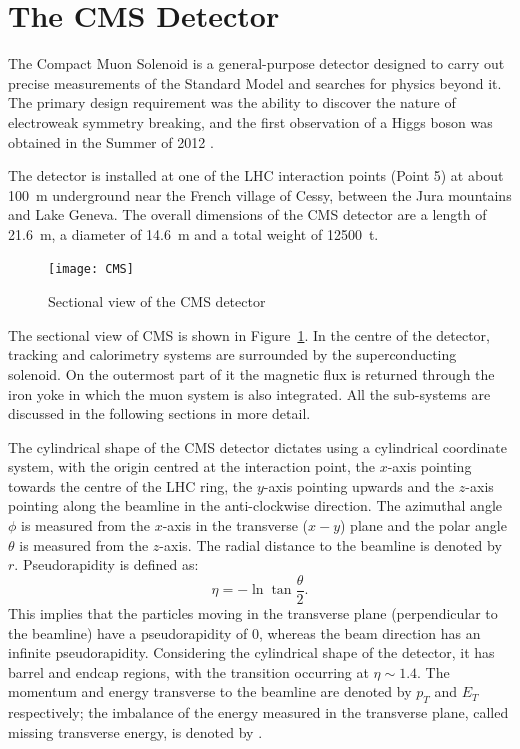 \section{The CMS Detector}
\label{s:CMS}

The Compact Muon Solenoid \autocite{CMS} is a general-purpose detector designed to carry out precise measurements of the
Standard Model and searches for physics beyond it. The primary design requirement was the ability to discover the nature
of electroweak symmetry breaking, and the first observation of a Higgs boson was obtained in the Summer of 2012
\autocite{CMS_higgs_observation}.

The detector is installed at one of the LHC interaction points (Point 5) at about \SI{100}{\metre} underground near the
French village of Cessy, between the Jura mountains and Lake Geneva. The overall dimensions of the CMS detector are a
length of \SI{21.6}{\metre}, a diameter of \SI{14.6}{\metre} and a total weight of \SI{12500}{\tonne}.

\begin{figure}[htbp]
  \centering
  \leavevmode
  \texttt{[image: CMS]}
  \caption{Sectional view of the CMS detector}
  \label{fig:CMS}
\end{figure}

The sectional view of CMS is shown in Figure~\ref{fig:CMS}. In the centre of the detector, tracking and calorimetry
systems are surrounded by the superconducting solenoid. On the outermost part of it the magnetic flux is returned
through the iron yoke in which the muon system is also integrated. All the sub-systems are discussed in the following
sections in more detail.

The cylindrical shape of the CMS detector dictates using a cylindrical coordinate system, with the origin centred at the
interaction point, the $x$-axis pointing towards the centre of the LHC ring, the $y$-axis pointing upwards and the
$z$-axis pointing along the beamline in the anti-clockwise direction. The azimuthal angle $\phi$ is measured from the
$x$-axis in the transverse ($x-y$) plane and the polar angle $\theta$ is measured from the $z$-axis. The radial distance
to the beamline is denoted by $r$. Pseudorapidity is defined as:
\begin{equation}
  \eta = - \ln{\tan{\frac{\theta}{2}}}.
\end{equation}
This implies that the particles moving in the transverse plane (perpendicular to the beamline) have a pseudorapidity of
0, whereas the beam direction has an infinite pseudorapidity. Considering the cylindrical shape of the detector, it has
barrel and endcap regions, with the transition occurring at $\eta \sim 1.4$. The momentum and energy transverse to the
beamline are denoted by $p_T$ and $E_T$ respectively; the imbalance of the energy measured in the transverse plane,
called missing transverse energy, is denoted by \ETm.

